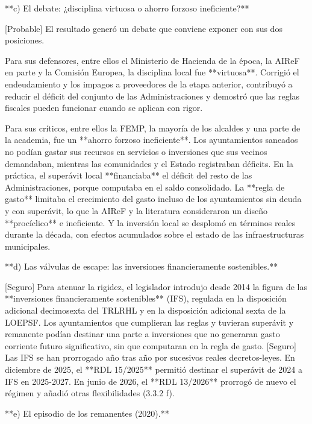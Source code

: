 \documentclass[10pt,a4paper]{article}
\begin{document}
**c) El debate: ¿disciplina virtuosa o ahorro forzoso ineficiente?**

[Probable] El resultado generó un debate que conviene exponer con sus dos posiciones.

Para sus defensores, entre ellos el Ministerio de Hacienda de la época, la AIReF en parte y la Comisión Europea, la disciplina local fue **virtuosa**. Corrigió el endeudamiento y los impagos a proveedores de la etapa anterior, contribuyó a reducir el déficit del conjunto de las Administraciones y demostró que las reglas fiscales pueden funcionar cuando se aplican con rigor.

Para sus críticos, entre ellos la FEMP, la mayoría de los alcaldes y una parte de la academia, fue un **ahorro forzoso ineficiente**. Los ayuntamientos saneados no podían gastar sus recursos en servicios o inversiones que sus vecinos demandaban, mientras las comunidades y el Estado registraban déficits. En la práctica, el superávit local **financiaba** el déficit del resto de las Administraciones, porque computaba en el saldo consolidado. La **regla de gasto** limitaba el crecimiento del gasto incluso de los ayuntamientos sin deuda y con superávit, lo que la AIReF y la literatura consideraron un diseño **procíclico** e ineficiente. Y la inversión local se desplomó en términos reales durante la década, con efectos acumulados sobre el estado de las infraestructuras municipales.

**d) Las válvulas de escape: las inversiones financieramente sostenibles.**

[Seguro] Para atenuar la rigidez, el legislador introdujo desde 2014 la figura de las **inversiones financieramente sostenibles** (IFS), regulada en la disposición adicional decimosexta del TRLRHL y en la disposición adicional sexta de la LOEPSF. Los ayuntamientos que cumplieran las reglas y tuvieran superávit y remanente podían destinar una parte a inversiones que no generaran gasto corriente futuro significativo, sin que computaran en la regla de gasto. [Seguro] Las IFS se han prorrogado año tras año por sucesivos reales decretos-leyes. En diciembre de 2025, el **RDL 15/2025** permitió destinar el superávit de 2024 a IFS en 2025-2027. En junio de 2026, el **RDL 13/2026** prorrogó de nuevo el régimen y añadió otras flexibilidades (3.3.2 f).

**e) El episodio de los remanentes (2020).**
\end{document}
